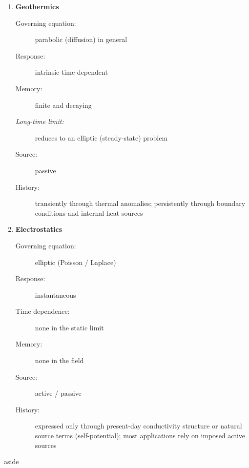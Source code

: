 {\begin{enumerate}
        \item \textbf{Geothermics}
        \begin{description}
            \item[Governing equation:] parabolic (diffusion) in general
            \item[Response:] intrinsic time-dependent
            \item[Memory:] finite and decaying
            \item[\emph{Long-time limit:}] reduces to an elliptic (steady-state) problem
            \item[Source:] passive
            \item[History:] transiently through thermal anomalies; persistently through boundary conditions and internal heat sources
        \end{description}

        \item \textbf{Electrostatics}
        \begin{description}
            \item[Governing equation:] elliptic (Poisson / Laplace)
            \item[Response:] instantaneous
            \item[Time dependence:] none in the static limit
            \item[Memory:] none in the field
            \item[Source:] active / passive
            \item[History:] expressed only through present-day conductivity structure or natural source terms (self-potential); most applications rely on imposed active sources
        \end{description}
    \end{enumerate}
}{aside}

\clearpage
\nocite{Beardsmore&Cull2001}
\nocite{Carslaw&Jaeger1986}
\nocite{Fowler1990}
\nocite{Jaupart&Mareschal2011}
\nocite{Lowrie1997}


